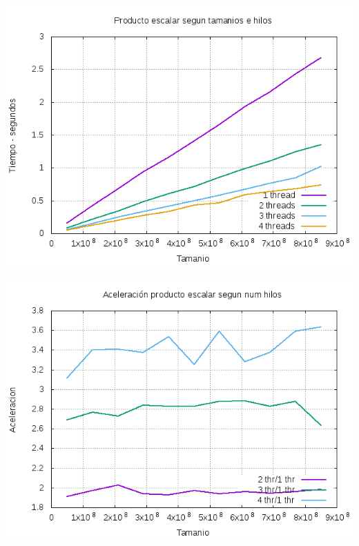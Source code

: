 \documentclass{report}
\begin{document}
\begin{enumerate}
		\begin{center}
			\includegraphics[width=6in]{imagenes_memoria/pescalar.png}
		\end{center}
		\begin{center}
			\includegraphics[width=6in]{imagenes_memoria/acc.png}
		\end{center}
		

\end{enumerate}
\end{document}
